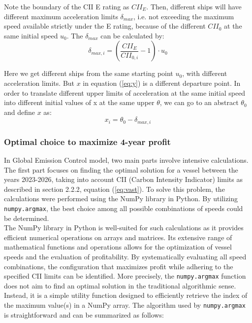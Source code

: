 \documentclass[a4paper,12pt]{article}
\begin{document}
Note the boundary of the CII E rating as $CII_E$.
Then, different ships will have different maximum acceleration limits $\delta_{max}$, i.e. not exceeding the maximum speed available strictly under the E rating, because of the different $CII_0$ at the same initial speed $u_0$. The $\delta_{max}$ can be calculated by:
\begin{equation}
	\delta_{max,i} = \left( \dfrac{CII_E}{CII_{0,i}} -1 \right) \cdot u_0
\end{equation}

Here we get different ships from the same starting point $u_0$, with different acceleration limits.
But $x$ in equation (\ref{eq:y}) is a different departure point. In order to translate different upper limits of acceleration at the same initial speed into different initial values of x at the same upper $\theta$, we can go to an abstract $\theta_0$ and define $x$ as:
\begin{equation}
	x_i = \theta_0 - \delta_{max,i}
\end{equation}

\subsubsection{Optimal choice to maximize 4-year profit}

In Global Emission Control model, two main parts involve intensive calculations.
The first part focuses on finding the optimal solution for a vessel between the years 2023-2026, taking into account CII (Carbon Intensity Indicator) limits as described in section 2.2.2, equation ({\ref{eq:vast}}).
To solve this problem, the calculations were performed using the NumPy library in Python.
By utilizing \texttt{numpy.argmax}, the best choice among all possible combinations of speeds could be determined.\\

The NumPy library in Python is well-suited for such calculations as it provides efficient numerical operations on arrays and matrices.
Its extensive range of mathematical functions and operations allows for the optimization of vessel speeds and the evaluation of profitability.
By systematically evaluating all speed combinations, the configuration that maximizes profit while adhering to the specified CII limits can be identified.
More precisely, the \texttt{numpy.argmax} function does not aim to find an optimal solution in the traditional algorithmic sense. Instead, it is a simple utility function designed to efficiently retrieve the index of the maximum value(s) in a NumPy array.
The algorithm used by \texttt{numpy.argmax} is straightforward and can be summarized as follows:
\end{document}
